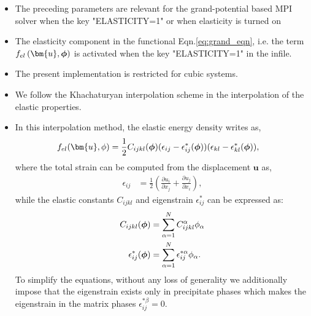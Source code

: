 \documentclass[a4paper,10pt]{article}
\newcommand{\vphi}{\mbox{\boldmath{$\phi$}}}
\begin{document}
\begin{itemize}
 \item The preceding parameters are relevant for the grand-potential based MPI solver when the key "ELASTICITY=1" or when elasticity is turned on
 \item The elasticity component in the functional Eqn.\ref{eq:grand_eqn}, i.e. the term $f_{el}\left(\bm{u},\vphi\right)$ is activated when the key "ELASTICITY=1" in the infile.
 \item The present implementation is restricted for cubic systems.
 \item We follow the Khachaturyan interpolation scheme in the interpolation of the elastic properties.
 \item 
 In this interpolation method, the elastic energy density writes as,
\begin{align}
f_{el}(\bm{u}, \phi) &= \dfrac{1}{2}C_{ijkl}(\vphi)(\epsilon_{ij} - \epsilon^*_{ij}(\vphi))(\epsilon_{kl} 
- \epsilon^*_{kl}(\vphi)),
\end{align} 
where the total strain can be computed from the displacement $\bm{u}$ as,
\begin{align}
 \epsilon_{ij} &= \frac{1}{2}\left(\frac{\partial u_i}{\partial x_j} + \frac{\partial u_j}{\partial x_i}\right)
 \label{strain},
\end{align}
while the elastic constants $C_{ijkl}$ and eigenstrain $\epsilon^*_{ij}$ can be expressed as:
\begin{align}
 C_{ijkl}(\vphi) &= \sum_{\alpha=1}^{N}C^{\alpha}_{ijkl}\phi_\alpha\\ \nonumber
 \epsilon^*_{ij}(\vphi) &= \sum_{\alpha=1}^{N}\epsilon^{*\alpha}_{ij}\phi_\alpha. 
\end{align}
To simplify the equations, without any loss of generality we additionally impose that
the eigenstrain exists only in precipitate phases which makes the 
eigenstrain in the matrix phases $\epsilon^{* \beta}_{ij}=0$.


\end{itemize}
\end{document}
